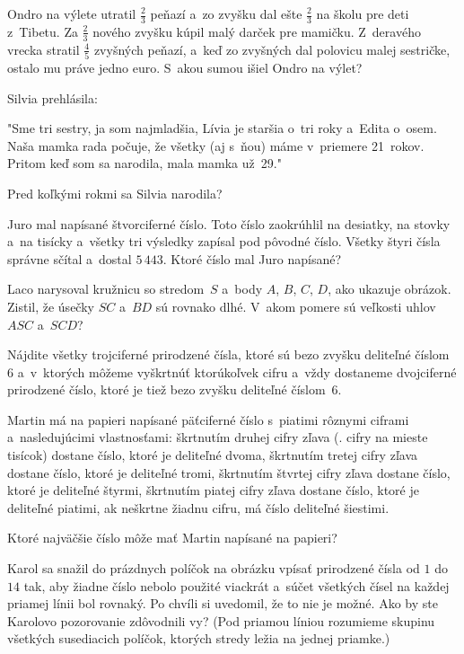{%
Ondro na výlete utratil $\frac23$ peňazí a~zo zvyšku dal ešte $\frac23$ na školu pre
deti z~Tibetu. Za $\frac23$ nového zvyšku kúpil malý darček pre mamičku.
Z~deravého vrecka stratil $\frac45$ zvyšných peňazí, a~keď zo zvyšných dal polovicu malej
sestričke, ostalo mu práve jedno euro.
S~akou sumou išiel Ondro na výlet?}

{%
Silvia prehlásila:

"Sme tri sestry, ja som najmladšia, Lívia je staršia o~tri roky
a~Edita o~osem.
Naša mamka rada počuje, že všetky (aj s~ňou) máme
v~priemere 21~rokov. Pritom keď som sa narodila, mala mamka už~29."

Pred koľkými rokmi sa Silvia narodila?}

{%
Juro mal napísané štvorciferné číslo. Toto číslo zaokrúhlil na desiatky, na
stovky a~na tisícky a~všetky tri výsledky zapísal pod pôvodné číslo. Všetky
štyri čísla správne sčítal a~dostal $5\,443$.
Ktoré číslo mal Juro napísané?}

{%
Laco narysoval kružnicu so stredom~$S$ a~body $A$, $B$, $C$, $D$, ako ukazuje
obrázok. Zistil, že úsečky $SC$ a~$BD$ sú rovnako dlhé. V~akom pomere sú
veľkosti uhlov $ASC$ a~$SCD$?
%
}

{%
Nájdite všetky trojciferné prirodzené čísla, ktoré sú bezo zvyšku deliteľné
číslom~$6$ a~v~ktorých môžeme vyškrtnúť ktorúkoľvek cifru a~vždy dostaneme
dvojciferné prirodzené číslo, ktoré je tiež bezo zvyšku deliteľné číslom~$6$.}

{%
Martin má na papieri napísané päťciferné číslo s~piatimi rôznymi ciframi a~nasledujúcimi vlastnosťami:
  \itemitem{$\bullet$} škrtnutím druhej cifry zľava (\tj. cifry na mieste tisícok)
    dostane číslo, ktoré je deliteľné dvoma,
  \itemitem{$\bullet$} škrtnutím tretej cifry zľava dostane číslo, ktoré je deliteľné tromi,
  \itemitem{$\bullet$} škrtnutím štvrtej cifry zľava dostane číslo, ktoré je deliteľné štyrmi,
  \itemitem{$\bullet$} škrtnutím piatej cifry zľava dostane číslo, ktoré je deliteľné piatimi,
  \itemitem{$\bullet$} ak neškrtne žiadnu cifru, má číslo deliteľné šiestimi.

Ktoré najväčšie číslo môže mať Martin napísané na papieri?}

{%
Karol sa snažil do prázdnych políčok na obrázku vpísať prirodzené čísla od $1$ do
$14$ tak, aby žiadne číslo nebolo použité viackrát a~súčet všetkých čísel na každej
priamej línii bol rovnaký.
Po chvíli si uvedomil, že to nie je možné.
Ako by ste Karolovo pozorovanie zdôvodnili vy?
(Pod priamou líniou rozumieme skupinu všetkých susediacich políčok, ktorých stredy
ležia na jednej priamke.)
%
}

